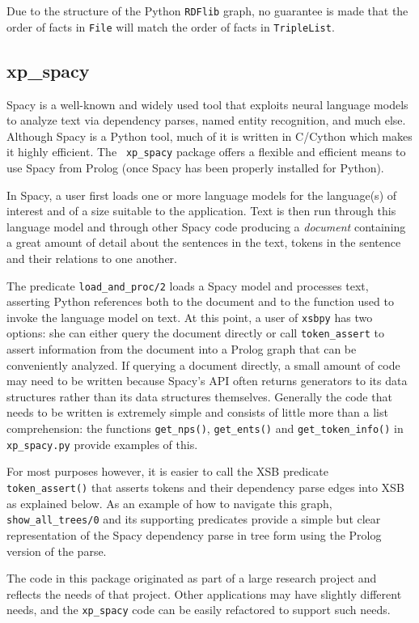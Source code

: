 Due to the structure of the Python {\tt RDFlib} graph, no guarantee is
made that the order of facts in {\tt File} will match the order of
facts in {\tt TripleList}.
  
\subsection{xp\_spacy}
Spacy is a well-known and widely used tool that exploits neural
language models to analyze text via dependency parses, named entity
recognition, and much else.  Although Spacy is a Python tool, much of
it is written in C/Cython which makes it highly efficient.  The {\tt
  xp\_spacy} package offers a flexible and efficient means to use
Spacy from Prolog (once Spacy has been properly installed for Python).

In Spacy, a user first loads one or more language models for the
language(s) of interest and of a size suitable to the application.
Text is then run through this language model and through other Spacy
code producing a {\em document} containing a great amount of detail
about the sentences in the text, tokens in the sentence and their
relations to one another.

The predicate {\tt load\_and\_proc/2} loads a Spacy model and
processes text, asserting Python references both to the document and
to the function used to invoke the language model on text.  At this
point, a user of {\tt xsbpy} has two options: she can either query the
document directly or call {\tt token\_assert} to assert information
from the document into a Prolog graph that can be conveniently
analyzed.  If querying a document directly, a small amount of code may
need to be written because Spacy's API often returns generators to its
data structures rather than its data structures themselves.  Generally
the code that needs to be written is extremely simple and consists of
little more than a list comprehension: the functions {\tt get\_nps()},
{\tt get\_ents()} and {\tt get\_token\_info()} in {\tt xp\_spacy.py}
provide examples of this.

For most purposes however, it is easier to call the XSB predicate {\tt
  token\_assert()} that asserts tokens and their dependency parse
edges into XSB as explained below.  As an example of how to navigate
this graph, {\tt show\_all\_trees/0} and its supporting predicates
provide a simple but clear representation of the Spacy dependency
parse in tree form using the Prolog version of the parse.

The code in this package originated as part of a large research
project and reflects the needs of that project.  Other applications
may have slightly different needs, and the {\tt xp\_spacy} code can be
easily refactored to support such needs.

